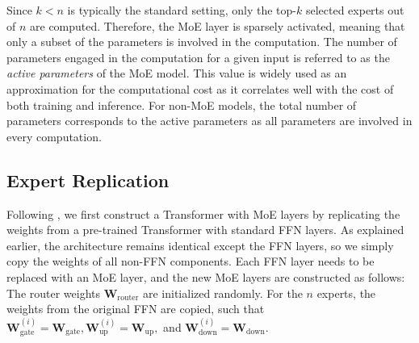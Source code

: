 Since \(k < n\) is typically the standard setting, only the top-$k$ selected experts out of \(n\) are computed. Therefore, the MoE layer is sparsely activated, meaning that only a subset of the parameters is involved in the computation. The number of parameters engaged in the computation for a given input is referred to as the \emph{active parameters} of the MoE model. This value is widely used as an approximation for the computational cost as it correlates well with the cost of both training and inference.
For non-MoE models, the total number of parameters corresponds to the active parameters as all parameters are involved in every computation.





\subsection{Expert Replication}


Following \citep{komatsuzaki2023sparse}, we first construct a Transformer with MoE layers by replicating the weights from a pre-trained Transformer with standard FFN layers. As explained earlier, the architecture remains identical except the FFN layers, so we simply copy the weights of all non-FFN components. Each FFN layer needs to be replaced with an MoE layer, and the new MoE layers are constructed as follows:
%
The router weights \(\mathbf{W}_\text{router}\) are initialized randomly. For the \(n\) experts, the weights from the original FFN are copied, such that \(\mathbf{W}^{(i)}_\text{gate} = \mathbf{W}_\text{gate}, \mathbf{W}^{(i)}_\text{up} = \mathbf{W}_\text{up},\) and \(\mathbf{W}^{(i)}_\text{down} = \mathbf{W}_\text{down}\).

